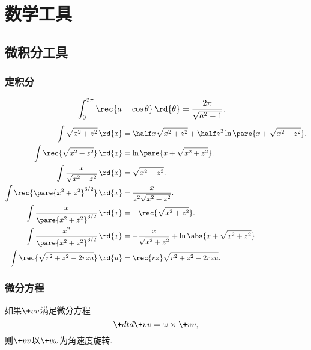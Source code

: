 \documentclass[hidelinks]{ctexart}
\begin{document}



\section{数学工具} %
\label{sec:数学工具}

\subsection{微积分工具} %
\label{sub:微积分工具}

\subsubsection{定积分} %
\label{ssub:定积分}

\begin{align}
    \label{eq:oint_rec_cos}
    \int_0^{2\pi} \rec{a+\cos\theta}\,\rd{\theta} &= \frac{2\pi}{\sqrt{a^2 - 1}}.
\end{align}
\begin{align}
    \int \sqrt{x^2+z^2}\,\rd{x} &= \half x\sqrt{x^2+z^2} + \half z^2 \ln\pare{x+\sqrt{x^2+z^2}}. \\
    \int \rec{\sqrt{x^2+z^2}}\,\rd{x} &= \ln \pare{x+\sqrt{x^2+z^2}}.\\
    \int \frac{x}{\sqrt{x^2+z^2}}\,\rd{x} &= \sqrt{x^2+z^2}.\\
    \label{eq:x_over_r3_int}\int \rec{\pare{x^2+z^2}^{3/2}}\,\rd{x} &= \frac{x}{z^2\sqrt{x^2+z^2}}.\\
    \int \frac{x}{\pare{x^2+z^2}^{3/2}}\,\rd{x} &= -\rec{\sqrt{x^2+z^2}}.\\
    \int \frac{x^2}{\pare{x^2+z^2}^{3/2}}\,\rd{x} &= -\frac{x}{\sqrt{x^2+z^2}} + \ln\abs{x+\sqrt{x^2+z^2}}.\\
    \int \rec{\sqrt{r^2+z^2-2rzu}}\,\rd{u} &= \rec{rz}\sqrt{r^2+z^2-2rzu}. 
\end{align}


\subsubsection{微分方程} %
\label{ssub:微分方程}

\begin{lemma}
    \label{lem:旋转矢量的微分方程}
    如果$\+vv$满足微分方程
    \[ \+dtd{\+vv} = \omega\times\+vv, \]
    则$\+vv$以$\+v\omega$为角速度旋转.
\end{lemma}



\end{document}
